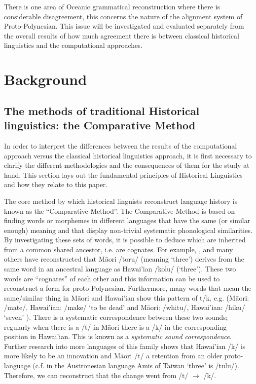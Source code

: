 \documentclass[a4paper,10pt]{article} %
\begin{document}
There is one area of Oceanic grammatical reconstruction where there is considerable disagreement, this concerns the nature of the alignment system of Proto-Polynesian. This issue will be investigated and evaluated separately from the overall results of how much agreement there is between classical historical linguistics and the computational approaches.



\section{Background}
\label{recon_grammar}


\subsection{The methods of traditional Historical linguistics: the Comparative Method}
\label{sec:ars:metod:hist}
In order to interpret the differences between the results of the computational approach versus the classical historical linguistics approach, it is first necessary to clarify the different methodologies and the consequences of them for the study at hand. This section lays out the fundamental principles of Historical Linguistics and how they relate to this paper.

The core method by which historical linguists reconstruct language history is known as the ``Comparative Method''. The Comparative Method is based on finding words or morphemes in different languages that have the same (or similar enough) meaning and that display non-trivial systematic phonological similarities. By investigating these sets of words, it is possible to deduce which are inherited from a common shared ancestor, i.e. are cognates. For example, \citet{blust2004}, \citet{greenhill2011pollex} and many others have reconstructed that M\={a}ori /toru/ (meaning `three') derives from the same word in an ancestral language as Hawai'ian /kolu/ (`three'). These two words are ``cognates'' of each other and this information can be used to reconstruct a form for proto-Polynesian. Furthermore, many words that mean the same/similar thing in M\={a}ori and Hawai'ian show this pattern of t/k, e.g. (M\={a}ori: /mate/, Hawai'ian: /make/ `to be dead'  and M\={a}ori: /whitu/, Hawai'ian: /hiku/ `seven' \citep{ABVD}). There is a systematic correspondence between these two sounds; regularly when there is a /t/ in M\={a}ori there is a /k/ in the corresponding position in Hawai'ian. This is known as a \emph{systematic sound correspondence}. Further research into more languages of this family shows that Hawai'ian /k/ is more likely to be an innovation and M\={a}ori /t/ a retention from an older proto-language (c.f. in the Austronesian language Amis of Taiwan `three' is /tulu/). Therefore, we can reconstruct that the change went from /t/ $\rightarrow$ /k/.
\end{document}
